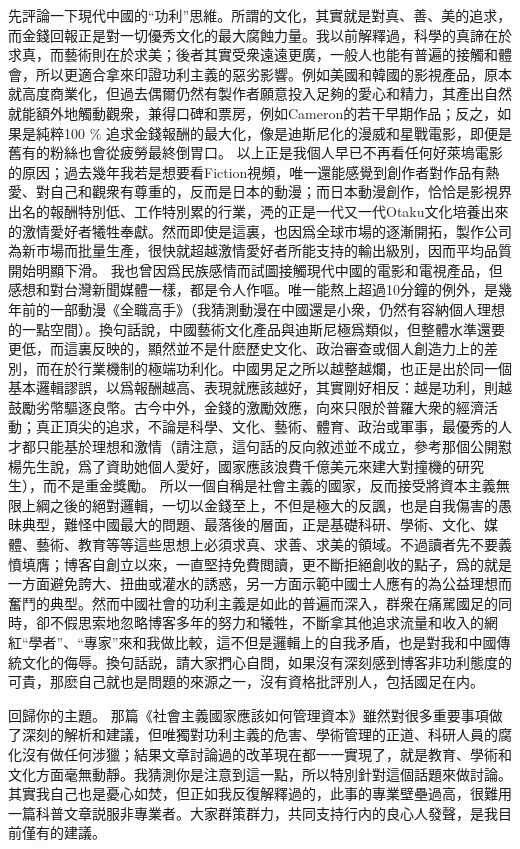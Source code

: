 \documentclass[twocolumn]{ctexart}
\begin{document}
先評論一下現代中國的“功利”思維。所謂的文化，其實就是對真、善、美的追求，而金錢回報正是對一切優秀文化的最大腐蝕力量。我以前解釋過，科學的真諦在於求真，而藝術則在於求美；後者其實受衆遠遠更廣，一般人也能有普遍的接觸和體會，所以更適合拿來印證功利主義的惡劣影響。例如美國和韓國的影視產品，原本就高度商業化，但過去偶爾仍然有製作者願意投入足夠的愛心和精力，其產出自然就能額外地觸動觀衆，兼得口碑和票房，例如Cameron的若干早期作品；反之，如果是純粹100 \% 追求金錢報酬的最大化，像是迪斯尼化的漫威和星戰電影，即便是舊有的粉絲也會從疲勞最終倒胃口。
以上正是我個人早已不再看任何好萊塢電影的原因；過去幾年我若是想要看Fiction視頻，唯一還能感覺到創作者對作品有熱愛、對自己和觀衆有尊重的，反而是日本的動漫；而日本動漫創作，恰恰是影視界出名的報酬特別低、工作特別累的行業，凴的正是一代又一代Otaku文化培養出來的激情愛好者犧牲奉獻。然而即使是這裏，也因爲全球市場的逐漸開拓，製作公司為新市場而批量生產，很快就超越激情愛好者所能支持的輸出級別，因而平均品質開始明顯下滑。
我也曾因爲民族感情而試圖接觸現代中國的電影和電視產品，但感想和對台灣新聞媒體一樣，都是令人作嘔。唯一能熬上超過10分鐘的例外，是幾年前的一部動漫《全職高手》（我猜測動漫在中國還是小衆，仍然有容納個人理想的一點空間）。換句話說，中國藝術文化產品與迪斯尼極爲類似，但整體水準還要更低，而這裏反映的，顯然並不是什麽歷史文化、政治審查或個人創造力上的差別，而在於行業機制的極端功利化。中國男足之所以越整越爛，也正是出於同一個基本邏輯謬誤，以爲報酬越高、表現就應該越好，其實剛好相反：越是功利，則越鼓勵劣幣驅逐良幣。古今中外，金錢的激勵效應，向來只限於普羅大衆的經濟活動；真正頂尖的追求，不論是科學、文化、藝術、體育、政治或軍事，最優秀的人才都只能基於理想和激情（請注意，這句話的反向敘述並不成立，參考那個公開懟楊先生說，爲了資助她個人愛好，國家應該浪費千億美元來建大對撞機的研究生），而不是重金獎勵。
所以一個自稱是社會主義的國家，反而接受將資本主義無限上綱之後的絕對邏輯，一切以金錢至上，不但是極大的反諷，也是自我傷害的愚昧典型，難怪中國最大的問題、最落後的層面，正是基礎科研、學術、文化、媒體、藝術、教育等等這些思想上必須求真、求善、求美的領域。不過讀者先不要義憤填膺；博客自創立以來，一直堅持免費閲讀，更不斷拒絕創收的點子，爲的就是一方面避免誇大、扭曲或灌水的誘惑，另一方面示範中國士人應有的為公益理想而奮鬥的典型。然而中國社會的功利主義是如此的普遍而深入，群衆在痛駡國足的同時，卻不假思索地忽略博客多年的努力和犧牲，不斷拿其他追求流量和收入的網紅“學者”、“專家”來和我做比較，這不但是邏輯上的自我矛盾，也是對我和中國傳統文化的侮辱。換句話説，請大家捫心自問，如果沒有深刻感到博客非功利態度的可貴，那麽自己就也是問題的來源之一，沒有資格批評別人，包括國足在内。

回歸你的主題。
那篇《社會主義國家應該如何管理資本》雖然對很多重要事項做了深刻的解析和建議，但唯獨對功利主義的危害、學術管理的正道、科研人員的腐化沒有做任何涉獵；結果文章討論過的改革現在都一一實現了，就是教育、學術和文化方面毫無動靜。我猜測你是注意到這一點，所以特別針對這個話題來做討論。其實我自己也是憂心如焚，但正如我反復解釋過的，此事的專業壁壘過高，很難用一篇科普文章説服非專業者。大家群策群力，共同支持行内的良心人發聲，是我目前僅有的建議。
\end{document}
